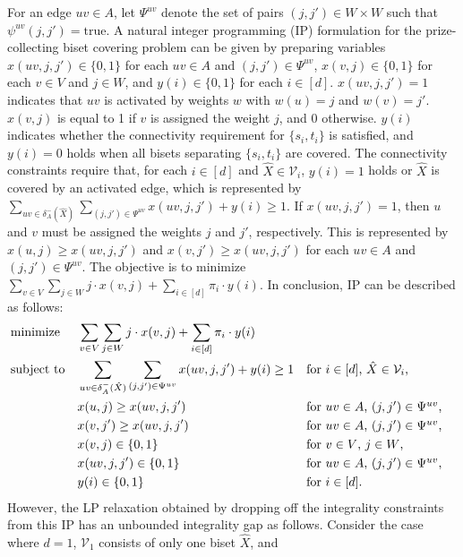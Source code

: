 \documentclass[11pt]{article}
\newcommand{\Vfam}{\mathcal{V}}
\newcommand{\true}{\mbox{true}}
\begin{document}
For an edge $uv\in A$,
let $\Psi^{uv}$ denote the set of pairs $(j,j') \in W \times W$
such that 
$\psi^{uv}(j,j') = \true$.
A natural integer programming (IP) formulation for the prize-collecting biset covering
problem can be given by preparing 
variables $x(uv,j,j') \in \{0,1\}$ for each $uv \in A$ and $(j,j') \in \Psi^{uv}$, 
$x(v,j) \in \{0,1\}$ for each $v \in V$ and $j \in W$, 
and $y(i) \in \{0,1\}$ for each $i \in [d]$.
$x(uv,j,j')=1$ indicates that $uv$ is activated 
by weights $w$ with $w(u)=j$ and $w(v)=j'$.
$x(v,j)$ is equal to 1 if $v$ is assigned the weight $j$, and $0$ otherwise.
$y(i)$ indicates whether the connectivity requirement for $\{s_i,t_i\}$
is satisfied, and
$y(i)=0$ holds when
all bisets separating $\{s_i,t_i\}$ are covered.
The connectivity constraints require that, for each $i \in [d]$ and 
$\hat{X} \in \Vfam_i$, 
$y(i)=1$ holds or $\hat{X}$ is
covered by an activated edge, which is represented by 
$\sum_{uv \in \delta^-_A(\hat{X})}\sum_{(j,j') \in \Psi^{uv}} x(uv,j,j') +y(i)\geq 1$.
If $x(uv,j,j')=1$, then $u$ and $v$ must be assigned the weights $j$ and $j'$,
respectively.
This is represented by $x(u,j) \geq x(uv,j,j')$ and 
$x(v,j')\geq x(uv,j,j')$ for each $uv \in A$ and $(j,j') \in \Psi^{uv}$.
The objective is to minimize $\sum_{v \in V}\sum_{j \in W}j \cdot x(v,j) +
\sum_{i \in [d]}\pi_i \cdot y(i)$.
In conclusion, IP can be described as follows:
\begin{align}
&\mbox{minimize} && \sum_{v \in V}\sum_{j \in W} j \cdot x(v,j)
 +\sum_{i\in [d]}\pi_i \cdot y(i)\notag\\
&\mbox{subject to} &&
\sum_{uv \in\delta^-_A(\hat{X})} \sum_{(j,j') \in \Psi^{uv}} x(uv,j,j') 
+ y(i)\geq 1
&&\mbox{for $i\in [d]$, $\hat{X} \in \Vfam_i$,}\notag\\ 
&&&
x(u,j) \geq x(uv,j,j')  &&\mbox{for $uv \in A$, $(j,j') \in \Psi^{uv}$,}\label{ip.c2}\\
 &&& 
 x(v,j')\geq x(uv,j,j')  &&\mbox{for $uv \in A$, $(j,j') \in \Psi^{uv}$,}\label{ip.c3}\\
&&& x(v,j) \in \{0,1\} &&\mbox{for $v \in V$, $j\in W$,}\notag \\
&&& x(uv,j,j') \in \{0,1\} &&\mbox{for $uv \in A$, $(j,j') \in \Psi^{uv}$,}\notag\\
&&& y(i) \in \{0,1\} &&\mbox{for $i \in [d]$.}\notag
\end{align}
However, the LP relaxation obtained by dropping off the integrality constraints
from this IP has an unbounded integrality gap as follows. Consider the case where 
$d=1$, $\Vfam_1$
consists of only one biset $\hat{X}$, and 
\end{document}
